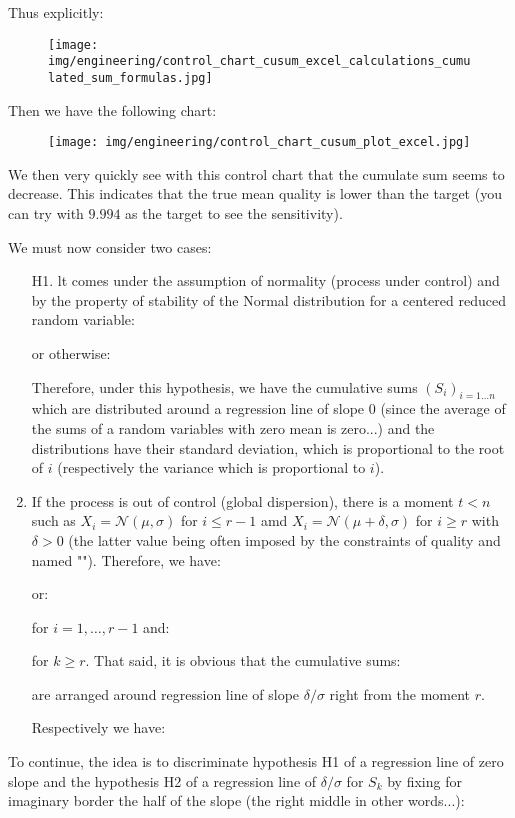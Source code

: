 	Thus explicitly:
	\begin{figure}[H]
		\centering
		\texttt{[image: img/engineering/control\_chart\_cusum\_excel\_calculations\_cumulated\_sum\_formulas.jpg]}
	\end{figure}
	Then we have the following chart:
	\begin{figure}[H]
		\centering
		\texttt{[image: img/engineering/control\_chart\_cusum\_plot\_excel.jpg]}
	\end{figure}
	We then very quickly see with this control chart that the cumulate sum seems to decrease. This indicates that the true mean quality is lower than the target (you can try with $9.994$ as the target to see the sensitivity).
	
	We must now consider two cases:
	\begin{enumerate}
		\item[H1.] lt comes under the assumption of normality (process under control) and by the property of stability of the Normal distribution for a centered reduced random variable:
		
		or otherwise:
		
		Therefore, under this hypothesis, we have the cumulative sums $(S_i)_{i=1\ldots n}$ which are distributed around a regression line of slope $0$ (since the average of the sums of a random variables with zero mean is zero...) and the distributions have their standard deviation, which is proportional to the root of $i$ (respectively the variance which is proportional to $i$).
		
		\item If the process is out of control (global dispersion), there is a moment $t<n$ such as $X_i=\mathcal{N}(\mu,\sigma)$ for $i\leq r-1$ amd $X_i=\mathcal{N}(\mu+\delta,\sigma)$ for $i\geq r$ with $\delta>0$ (the latter value being often imposed by the constraints of quality and named ""). Therefore, we have:
		
		or:
		
		for $i=1,\ldots,r-1$ and:
		
		for $k\geq r$. That said, it is obvious that the cumulative sums:
		
		are arranged around regression line of slope $\delta/\sigma$ right from the moment $r$.
	
		Respectively we have:
		
	\end{enumerate}
	To continue, the idea is to discriminate hypothesis H1 of a regression line of zero slope and the hypothesis H2 of a regression line of $\delta/\sigma$ for $S_k$ by fixing for imaginary border the half of the slope (the right middle in other words...):
	
